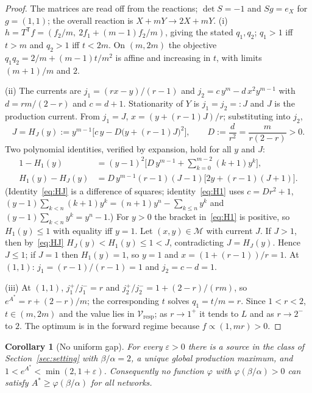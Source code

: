 \documentclass[11pt,reqno]{amsart}
\theoremstyle{plain}
\newtheorem{corollary}[theorem]{Corollary}
\theoremstyle{definition}
\theoremstyle{remark}
\numberwithin{equation}{section}
\newcommand{\T}{\mathsf{T}}
\newcommand{\Vresp}{\mathcal{V}_{\mathrm{resp}}}
\begin{document}
\begin{proof}
The matrices are read off from the reactions; $\det S=-1$ and $Sg=e_X$ for $g=(1,1)$; the overall reaction is $X+mY\to2X+mY$.  (i) $h=T^{\T}f=(f_2/m,\ 2f_1+(m-1)f_2/m)$, giving the stated $q_1,q_2$; $q_1>1$ iff $t>m$ and $q_2>1$ iff $t<2m$.  On $(m,2m)$ the objective $q_1q_2=2/m+(m-1)t/m^2$ is affine and increasing in $t$, with limits $(m+1)/m$ and $2$.

(ii) The currents are $j_1=(rx-y)/(r-1)$ and $j_2=c\,y^m-d\,x^2y^{m-1}$ with $d=rm/(2-r)$ and $c=d+1$.  Stationarity of $Y$ is $j_1=j_2=:J$ and $J$ is the production current.  From $j_1=J$, $x=(y+(r-1)J)/r$; substituting into $j_2$,
\[
J=H_J(y):=y^{m-1}\Big[c\,y-D\big(y+(r-1)J\big)^2\Big],\qquad D:=\frac{d}{r^2}=\frac{m}{r(2-r)}>0 .
\]
Two polynomial identities, verified by expansion, hold for all $y$ and $J$:
\begin{align}
1-H_1(y)&=(y-1)^2\Big[D\,y^{m-1}+\sum_{k=0}^{m-2}(k+1)y^k\Big],\label{eq:H1}\\
H_1(y)-H_J(y)&=D\,y^{m-1}(r-1)(J-1)\big[2y+(r-1)(J+1)\big].\label{eq:HJ}
\end{align}
(Identity~\eqref{eq:HJ} is a difference of squares; identity~\eqref{eq:H1} uses $c=D r^2+1$, $(y-1)\sum_{k<n}(k+1)y^k=(n+1)y^n-\sum_{k\le n}y^k$ and $(y-1)\sum_{k<n}y^k=y^n-1$.)  For $y>0$ the bracket in~\eqref{eq:H1} is positive, so $H_1(y)\le1$ with equality iff $y=1$.  Let $(x,y)\in\mathcal M$ with current $J$.  If $J>1$, then by~\eqref{eq:HJ} $H_J(y)<H_1(y)\le1<J$, contradicting $J=H_J(y)$.  Hence $J\le1$; if $J=1$ then $H_1(y)=1$, so $y=1$ and $x=(1+(r-1))/r=1$.  At $(1,1)$: $j_1=(r-1)/(r-1)=1$ and $j_2=c-d=1$.

(iii) At $(1,1)$, $j^+_1/j^-_1=r$ and $j^+_2/j^-_2=1+(2-r)/(rm)$, so $e^{A^*}=r+(2-r)/m$; the corresponding $t$ solves $q_1=t/m=r$.  Since $1<r<2$, $t\in(m,2m)$ and the value lies in $\Vresp$; as $r\to1^+$ it tends to $L$ and as $r\to2^-$ to $2$.  The optimum is in the forward regime because $f\propto(1,mr)>0$.
\end{proof}

\begin{corollary}[No uniform gap]\label{cor:nogap}
For every $\varepsilon>0$ there is a source in the class of Section~\ref{sec:setting} with $\beta/\alpha=2$, a unique global production maximum, and $1<e^{A^*}<\min(2,1+\varepsilon)$.  Consequently no function $\varphi$ with $\varphi(\beta/\alpha)>0$ can satisfy $A^*\ge\varphi(\beta/\alpha)$ for all networks.
\end{corollary}
\end{document}
